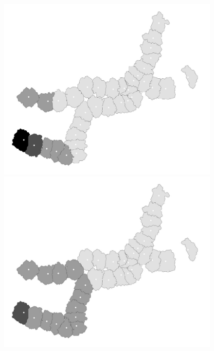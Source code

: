 \documentclass[utf8]{article}
\begin{document}
\begin{figure}[htbp]
	\begin{minipage}{0.48\linewidth}
		\centering
		\includegraphics[width=\linewidth]{TransportationFacility} %
	\end{minipage}
	\hfill %
	\begin{minipage}{0.48\linewidth}
		\centering
		\includegraphics[width=\linewidth]{BusCapacity}
	\end{minipage}


\end{figure}
\end{document}
